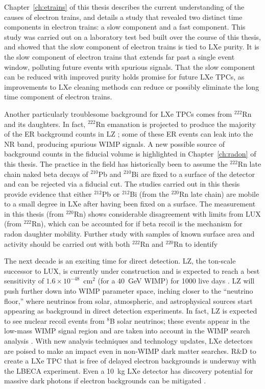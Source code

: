 Chapter~\ref{ch:etrains} of this thesis describes the current understanding of the causes of electron trains, and details a study that revealed two distinct time components in electron trains: a slow component and a fast component. This study was carried out on a laboratory test bed built over the course of this thesis, and showed that the slow component of electron trains is tied to \ac{LXe} purity. It is the slow component of electron trains that extends far past a single event window, polluting future events with spurious signals. That the slow component can be reduced with improved purity holds promise for future \ac{LXe} \ac{TPC}s, as improvements to \ac{LXe} cleaning methods can reduce or possibly eliminate the long time component of electron trains.

Another particularly troublesome background for \ac{LXe} \ac{TPC}s comes from $^{222}$Rn and its daughters. In fact, $^{222}$Rn emanation is projected to produce the majority of the \ac{ER} background counts in \ac{LZ} \cite{LZ:Sensitivity}; some of these \ac{ER} events can leak into the \ac{NR} band, producing spurious \ac{WIMP} signals. A new possible source of background counts in the fiducial volume is highlighted in Chapter~\ref{ch:radon} of this thesis. The practice in the field has historically been to assume the $^{222}$Rn late chain naked beta decays of $^{210}$Pb and $^{210}$Bi are fixed to a surface of the detector and can be rejected via a fiducial cut. The studies carried out in this thesis provide evidence that either $^{212}$Pb or $^{212}$Bi (from the $^{220}$Rn late chain) are mobile to a small degree in \ac{LXe} after having been fixed on a surface. The measurement in this thesis (from $^{220}$Rn) shows considerable disagreement with limits from \ac{LUX} (from $^{222}$Rn), which can be accounted for if beta recoil is the mechanism for radon daughter mobility. Further study with samples of known surface area and activity should be carried out with both $^{222}$Rn and $^{220}$Rn to identify 

The next decade is an exciting time for direct detection. \ac{LZ}, the ton-scale successor to \ac{LUX}, is currently under construction and is expected to reach a best sensitivity of $1.6 \times 10^{-48}$~cm$^{2}$ (for a 40~GeV \ac{WIMP}) for 1000 live days \cite{LZ:Sensitivity}. \ac{LZ} will push further down into \ac{WIMP} parameter space, inching closer to the ``neutrino floor,'' where neutrinos from solar, atmospheric, and astrophysical sources start appearing as background in direct detection experiments. In fact, \ac{LZ} is expected to see nuclear recoil events from $^{8}$B solar neutrinos; these events appear in the low-mass \ac{WIMP} signal region and are taken into account in the \ac{WIMP} search analysis \cite{LZ:Sensitivity}. With new analysis techniques and technology updates, \ac{LXe} detectors are poised to make an impact even in non-\ac{WIMP} dark matter searches. R\&D to create a \ac{LXe} \ac{TPC} that is free of delayed electron backgrounds is underway with the \ac{LBECA} experiment. Even a 10~kg \ac{LXe} detector has discovery potential for massive dark photons if electron backgrounds can be mitigated \cite{cosmicvisions2017}. 

